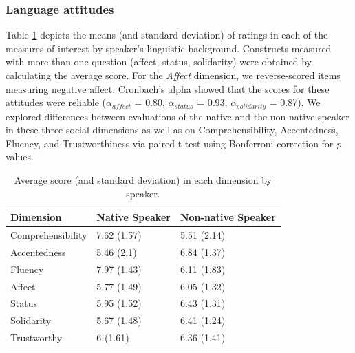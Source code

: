 \documentclass[
  man,floatsintext]{apa7}
\begin{document}
\hypertarget{language-attitudes}{%
\subsubsection{Language attitudes}\label{language-attitudes}}

Table \ref{tab:tab5} depicts the means (and standard deviation) of ratings in each of the measures of interest by speaker's linguistic background. Constructs measured with more than one question (affect, status, solidarity) were obtained by calculating the average score. For the \emph{Affect} dimension, we reverse-scored items measuring negative affect. Cronbach's alpha showed that the scores for these attitudes were reliable (\(\alpha_{affect}\) = 0.80, \(\alpha_{status}\) = 0.93, \(\alpha_{solidarity}\) = 0.87). We explored differences between evaluations of the native and the non-native speaker in these three social dimensions as well as on Comprehensibility, Accentedness, Fluency, and Trustworthiness via paired t-test using Bonferroni correction for \emph{p} values.

\begin{table}[tbp]

\begin{center}
\begin{threeparttable}

\caption{\label{tab:tab5}Average score (and standard deviation) in each dimension by speaker.}

\begin{tabular}{lll}
\toprule
Dimension & \multicolumn{1}{c}{Native Speaker} & \multicolumn{1}{c}{Non-native Speaker}\\
\midrule
Comprehensibility & 7.62 (1.57) & 5.51 (2.14)\\
Accentedness & 5.46 (2.1) & 6.84 (1.37)\\
Fluency & 7.97 (1.43) & 6.11 (1.83)\\
Affect & 5.77 (1.49) & 6.05 (1.32)\\
Status & 5.95 (1.52) & 6.43 (1.31)\\
Solidarity & 5.67 (1.48) & 6.41 (1.24)\\
Trustworthy & 6 (1.61) & 6.36 (1.41)\\
\bottomrule
\end{tabular}

\end{threeparttable}
\end{center}

\end{table}
\end{document}

